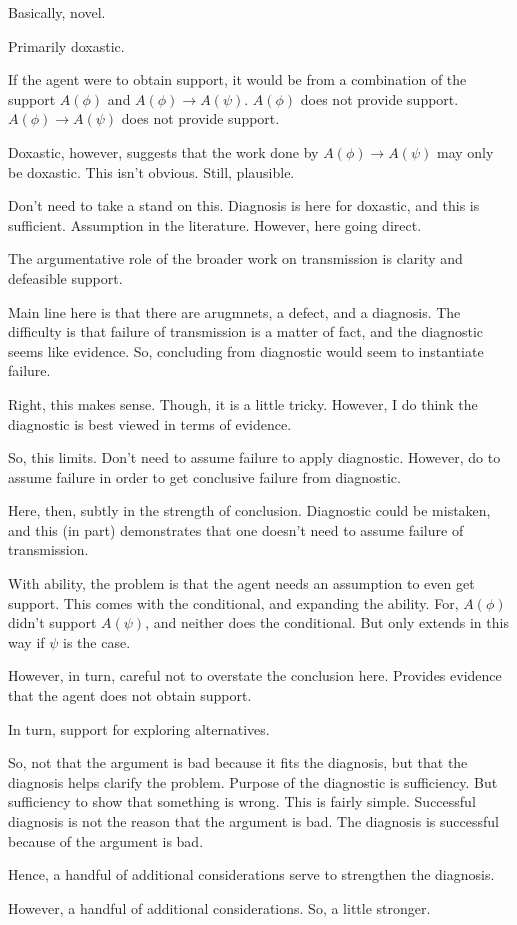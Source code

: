 \documentclass[10pt]{article}
\begin{document}
\begin{note}
  Basically, novel.

  Primarily doxastic.

  If the agent were to obtain support, it would be from a combination of the support \(A(\phi)\) and \(A(\phi) \rightarrow A(\psi)\).
  \(A(\phi)\) does not provide support.
  \(A(\phi) \rightarrow A(\psi)\) does not provide support.

  Doxastic, however, suggests that the work done by \(A(\phi) \rightarrow A(\psi)\) may only be doxastic.
  This isn't obvious.
  Still, plausible.

  Don't need to take a stand on this.
  Diagnosis is here for doxastic, and this is sufficient.
  Assumption in the literature.
  However, here going direct.

  The argumentative role of the broader work on transmission is clarity and defeasible support.

  Main line here is that there are arugmnets, a defect, and a diagnosis.
  The difficulty is that failure of transmission is a matter of fact, and the diagnostic seems like evidence.
  So, concluding from diagnostic would seem to instantiate failure.

  Right, this makes sense.
  Though, it is a little tricky.
  However, I do think the diagnostic is best viewed in terms of evidence.

  So, this limits.
  Don't need to assume failure to apply diagnostic.
  However, do to assume failure in order to get conclusive failure from diagnostic.

  Here, then, subtly in the strength of conclusion.
  Diagnostic could be mistaken, and this (in part) demonstrates that one doesn't need to assume failure of transmission.

  With ability, the problem is that the agent needs an assumption to even get support.
  This comes with the conditional, and expanding the ability.
  For, \(A(\phi)\) didn't support \(A(\psi)\), and neither does the conditional.
  But only extends in this way if \(\psi\) is the case.

  However, in turn, careful not to overstate the conclusion here.
  Provides evidence that the agent does not obtain support.

  In turn, support for exploring alternatives.

  So, not that the argument is bad because it fits the diagnosis, but that the diagnosis helps clarify the problem.
  Purpose of the diagnostic is sufficiency.
  But sufficiency to show that something is wrong.
  This is fairly simple.
  Successful diagnosis is not the reason that the argument is bad.
  The diagnosis is successful because of the argument is bad.

  Hence, a handful of additional considerations serve to strengthen the diagnosis.

  However, a handful of additional considerations.
  So, a little stronger.
\end{note}
\end{document}
